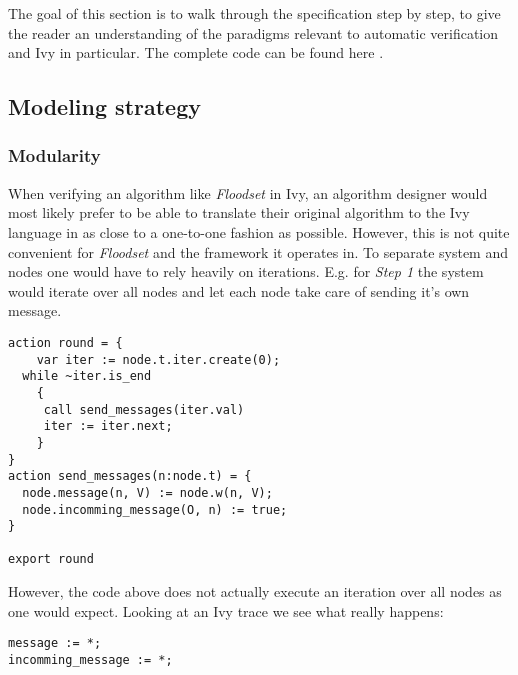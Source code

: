 \documentclass[fleqn]{article}
\begin{document}
The goal of this section is to walk through the specification step by step, to give the reader an understanding of the paradigms relevant to automatic verification and Ivy in particular. The complete code can be found here \cite{github}.

\subsection{Modeling strategy}

\subsubsection{Modularity}
When verifying an algorithm like \textit{Floodset} in Ivy, an algorithm designer would most likely prefer to be able to translate their original algorithm to the Ivy language in as close to a one-to-one fashion as possible. However, this is not quite convenient for \textit{Floodset} and the framework it operates in.
To separate system and nodes one would have to rely heavily on iterations. E.g. for \textit{Step 1} the system would iterate over all nodes and let each node take care of sending it's own message.

\begin{mdframed}[backgroundcolor=light-gray, roundcorner=10pt,leftmargin=1, rightmargin=1, innerleftmargin=15, innertopmargin=15,innerbottommargin=15, outerlinewidth=1, linecolor=light-gray]
\begin{lstlisting}
action round = {
	var iter := node.t.iter.create(0);
  while ~iter.is_end
	{
 	 call send_messages(iter.val)
	 iter := iter.next;
	}
}
action send_messages(n:node.t) = {
  node.message(n, V) := node.w(n, V);
  node.incomming_message(O, n) := true;
}

export round
\end{lstlisting}
\end{mdframed}

However, the code above does not actually execute an iteration over all nodes as one would expect. Looking at an Ivy trace we see what really happens:

\begin{mdframed}[backgroundcolor=light-gray, roundcorner=10pt,leftmargin=1, rightmargin=1, innerleftmargin=15, innertopmargin=15,innerbottommargin=15, outerlinewidth=1, linecolor=light-gray]
\begin{lstlisting}
message := *;
incomming_message := *;
\end{lstlisting}
\end{mdframed}
\end{document}
